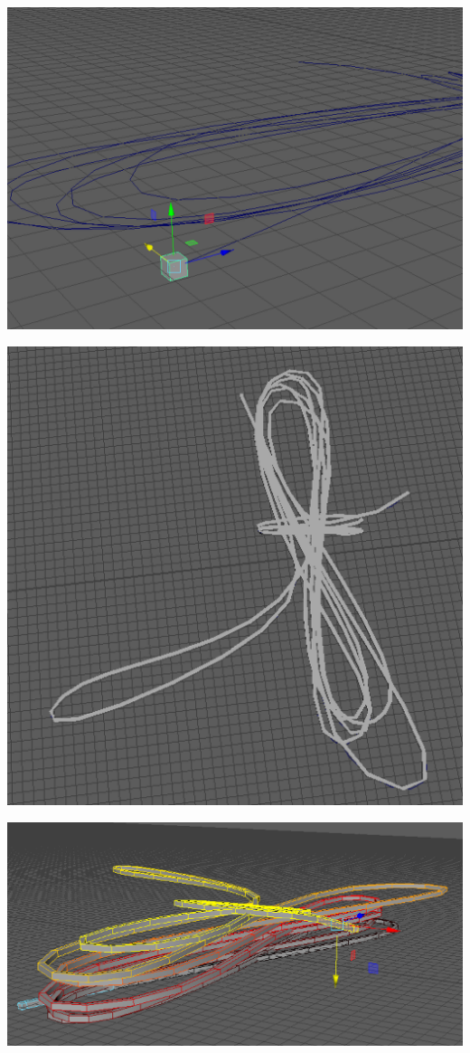 \documentclass[ %
                    author={Elis Jones},
                supervisor={Dr. Kirsten Cater},
                    degree={BSc},
                     title={The Effect of Presentation Medium on Spatial Cognition},
                  subtitle={in the Virtual Environment},
                      year={2018} ]{dissertation}
\begin{document}
\begin{minipage}{\textwidth}
\begin{center}
\begin{minipage}{0.18\textwidth}
        \includegraphics[width=1\textwidth]{images/towpoly.png}
    \end{minipage}\hfill
    \begin{minipage}{0.18\textwidth}
        \centering
        \includegraphics[width=1\textwidth]{images/towextrude.png}
    \end{minipage}\hfill
        \centering
    \begin{minipage}{0.18\textwidth}
        \centering
        \includegraphics[width=1\textwidth]{images/towsoft.png}

\end{minipage}
\end{center}
\end{minipage}
\end{document}
